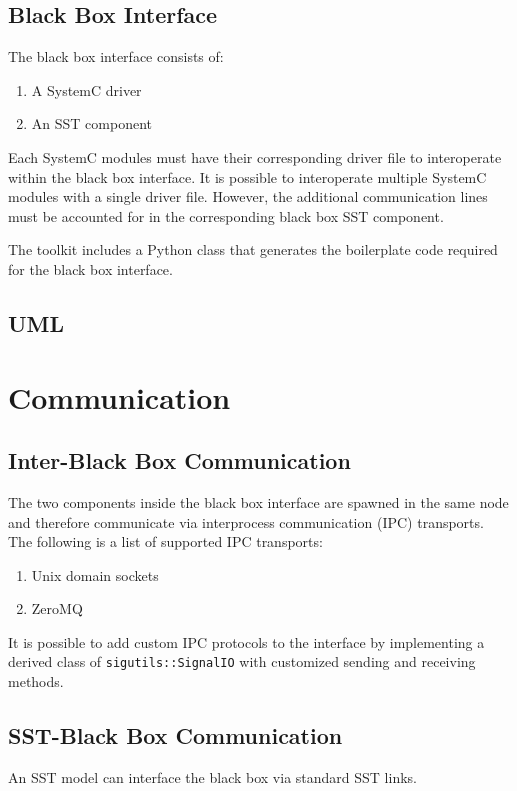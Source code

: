 \documentclass{article}
\begin{document}
    \subsection{Black Box Interface}
    The black box interface consists of:
    \begin{enumerate}
        \item A SystemC driver
        \item An SST component
    \end{enumerate}

    Each SystemC modules must have their corresponding driver file to interoperate within the black box interface. It is possible to interoperate multiple SystemC modules with a single driver file. However, the additional communication lines must be accounted for in the corresponding black box SST component.

    The toolkit includes a Python class that generates the boilerplate code required for the black box interface.

    \subsection{UML}

  \section{Communication} \label{sec:comm}

    \subsection{Inter-Black Box Communication}
    The two components inside the black box interface are spawned in the same node and therefore communicate via interprocess communication (IPC) transports. The following is a list of supported IPC transports:
    \begin{enumerate}
        \item Unix domain sockets
        \item ZeroMQ
    \end{enumerate}

    It is possible to add custom IPC protocols to the interface by implementing a derived class of \lstinline{sigutils::SignalIO} with customized sending and receiving methods.

    \subsection{SST-Black Box Communication}
    An SST model can interface the black box via standard SST links.
\end{document}
